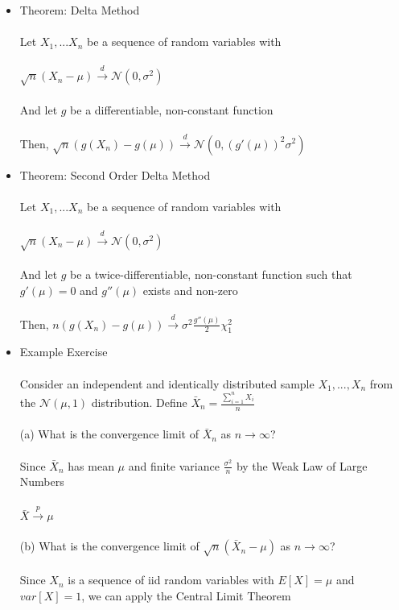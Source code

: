 \documentclass{article}
\begin{document}
\begin{itemize}
    \item Theorem: Delta Method\\\\
    Let $X_1,...X_n$ be a sequence of random variables with\\\\
    $\sqrt{n}(X_n-\mu)\xrightarrow{d}\mathcal{N}(0,\sigma^2)$\\\\
    And let $g$ be a differentiable, non-constant function\\\\
    Then, $\sqrt{n}(g(X_n)-g(\mu))\xrightarrow{d}\mathcal{N}(0,(g'(\mu))^2\sigma^2)$\\
    \item Theorem: Second Order Delta Method\\\\
    Let $X_1,...X_n$ be a sequence of random variables with\\\\
    $\sqrt{n}(X_n-\mu)\xrightarrow{d}\mathcal{N}(0,\sigma^2)$\\\\
    And let $g$ be a twice-differentiable, non-constant function such that\\
    $g'(\mu)=0$ and $g''(\mu)$ exists and non-zero\\\\
    Then, $n(g(X_n)-g(\mu))\xrightarrow{d}\sigma^2\frac{g''(\mu)}{2}\chi^2_1$\\
    \item Example Exercise\\\\
    Consider an independent and identically distributed sample $X_1,...,X_n$ from the $\mathcal{N}(\mu,1)$ distribution.  Define $\bar{X}_n=\frac{\sum_{i=1}^nX_i}{n}$\\\\
    (a) What is the convergence limit of $\bar{X}_n$ as $n\rightarrow\infty$?\\\\
    Since $\bar{X}_n$ has mean $\mu$ and finite variance $\frac{\sigma^2}{n}$ by the Weak Law of Large Numbers\\\\
    $\bar{X}\xrightarrow{p}\mu$\\\\
    (b) What is the convergence limit of $\sqrt{n}(\bar{X}_n-\mu)$ as $n\rightarrow\infty$?\\\\
    Since $X_n$ is a sequence of iid random variables with $E[X]=\mu$ and $var[X]=1$, we can apply the Central Limit Theorem\\\\

\end{itemize}
\end{document}

